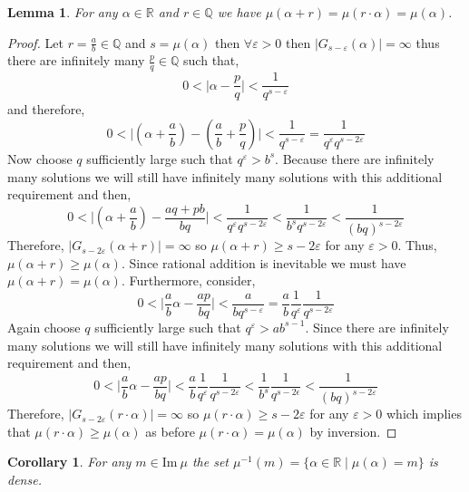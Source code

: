 \documentclass{article}
\newcommand{\Q}{\mathbb{Q}}
\newcommand{\R}{\mathbb{R}}
\renewcommand{\Im}[1]{\mathrm{Im} \: #1}
\theoremstyle{theorem}
\newtheorem{lemma}[theorem]{Lemma}
\newtheorem{corollary}[theorem]{Corollary}
\theoremstyle{definition}
\theoremstyle{definition}
\theoremstyle{remark}
\theoremstyle{definition}
\theoremstyle{remark}
\begin{document}
\begin{lemma}
For any $\alpha \in \R$ and $r \in \Q$ we have $\mu(\alpha + r) = \mu(r \cdot \alpha) = \mu(\alpha)$. 
\end{lemma}

\begin{proof}
Let $r = \frac{a}{b} \in \Q$ and $s = \mu(\alpha)$ then $\forall \varepsilon > 0$ then $|G_{s - \varepsilon}(\alpha)| = \infty$ thus there are infinitely many $\frac{p}{q} \in \Q$ such that,
\[ 0 < \Big| \alpha - \frac{p}{q} \Big| < \frac{1}{q^{s - \varepsilon}} \]
and therefore,
\[ 0 < \Big| \left( \alpha + \frac{a}{b} \right) - \left( \frac{a}{b} + \frac{p}{q} \right) \Big| < \frac{1}{q^{s - \varepsilon}} = \frac{1}{q^{\varepsilon} q^{s - 2\varepsilon}}  \]
Now choose $q$ sufficiently large such that $q^{\varepsilon} > b^{s}$. Because there are infinitely many solutions we will still have infinitely many solutions with this additional requirement and then,
\[ 0 < \Big| \left( \alpha + \frac{a}{b} \right) - \frac{aq + pb}{bq} \Big| < \frac{1}{q^{\varepsilon} q^{s - 2\varepsilon}} < \frac{1}{b^s q^{s - 2 \varepsilon}} < \frac{1}{(bq)^{s - 2 \varepsilon}} \]
Therefore, $|G_{s - 2\varepsilon}(\alpha + r)| = \infty$ so $\mu(\alpha +  r) \ge s - 2 \varepsilon$ for any $\varepsilon > 0$. Thus, $\mu(\alpha + r) \ge \mu(\alpha)$. Since rational addition is inevitable we must have $\mu(\alpha + r) = \mu(\alpha)$. Furthermore, consider,
\[ 0 < \Big|  \frac{a}{b} \alpha - \frac{ap}{bq} \Big| < \frac{a}{b q^{s - \varepsilon}} = \frac{a}{b} \frac{1}{q^\varepsilon} \frac{1}{q^{s - 2 \varepsilon}} \] 
Again choose $q$ sufficiently large such that $q^\varepsilon > a b^{s - 1}$. Since there are infinitely many solutions we will still have infinitely many solutions with this additional requirement and then,
\[ 0 < \Big|  \frac{a}{b} \alpha - \frac{ap}{bq} \Big| < \frac{a}{b} \frac{1}{q^\varepsilon} \frac{1}{q^{s - 2 \varepsilon}} < \frac{1}{b^s} \frac{1}{q^{s - 2 \epsilon}} < \frac{1}{(bq)^{s - 2 \varepsilon}} \]
Therefore, $|G_{s - 2\varepsilon}(r \cdot \alpha)| = \infty$ so $\mu(r\cdot \alpha ) \ge s - 2 \varepsilon$ for any $\varepsilon > 0$ which implies that $\mu(r \cdot \alpha ) \ge \mu(\alpha)$ as before $\mu(r \cdot \alpha) = \mu(\alpha)$ by inversion.
\end{proof}


\begin{corollary}
For any $m \in \Im{\mu}$ the set $\mu^{-1}(m) = \{ \alpha \in \R \mid \mu(\alpha) = m \}$ is dense. 
\end{corollary}
\end{document}
